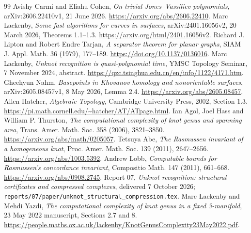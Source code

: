 \documentclass[11pt]{article}
\theoremstyle{remark}
\newcommand{\code}[1]{\texttt{#1}}
\begin{document}
\begin{thebibliography}{99}
 Avishy Carmi and Eliahu Cohen,
\emph{On trivial Jones--Vassiliev polynomials}, arXiv:2606.22410v1,
21 June 2026. \url{https://arxiv.org/abs/2606.22410}.
 Marc Lackenby, \emph{Some fast algorithms for
curves in surfaces}, arXiv:2401.16056v2, 20 March 2026, Theorems 1.1--1.3.
\url{https://arxiv.org/html/2401.16056v2}.
 Richard J. Lipton and Robert Endre Tarjan,
\emph{A separator theorem for planar graphs}, SIAM J. Appl. Math. 36 (1979),
177--189. \url{https://doi.org/10.1137/0136016}.
 Marc Lackenby, \emph{Unknot recognition is
quasi-polynomial time}, YMSC Topology Seminar, 7 November 2024, abstract.
\url{https://qzc.tsinghua.edu.cn/en/info/1122/4171.htm}.
 Gheehyun Nahm, \emph{Basepoints in Khovanov homology and nonorientable surfaces}, arXiv:2605.08457v1, 8 May 2026, Lemma 2.4. \url{https://arxiv.org/abs/2605.08457}.
 Allen Hatcher, \emph{Algebraic Topology}, Cambridge University Press, 2002, Section 1.3. \url{https://pi.math.cornell.edu/~hatcher/AT/ATpage.html}.
 Ian Agol, Joel Hass and William P. Thurston, \emph{The computational complexity of knot genus and spanning area}, Trans. Amer. Math. Soc. 358 (2006), 3821--3850. \url{https://arxiv.org/abs/math/0205057}.
 Tetsuya Abe, \emph{The Rasmussen invariant of a homogeneous knot}, Proc. Amer. Math. Soc. 139 (2011), 2647--2656. \url{https://arxiv.org/abs/1003.5392}.
 Andrew Lobb, \emph{Computable bounds for Rasmussen's concordance invariant}, Compositio Math. 147 (2011), 661--668. \url{https://arxiv.org/abs/0908.2745}.
 Report 07, \emph{Unknot recognition: structural certificates and compressed complexes}, delivered 7 October 2026; \code{reports/07/paper/unknot\_structural\_compression.tex}.\small
{} Marc Lackenby and Mehdi Yazdi, \emph{The computational complexity of knot genus in a fixed 3-manifold}, 23 May 2022 manuscript, Sections 2.7 and 8. \url{https://people.maths.ox.ac.uk/lackenby/KnotGenusComplexity23May2022.pdf}.


\end{thebibliography}
\end{document}
